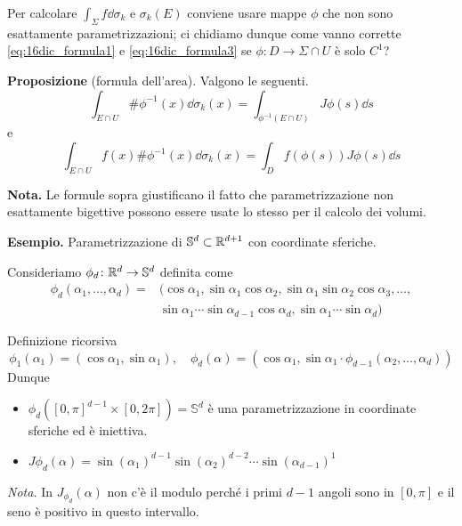 Per calcolare $\int_\Sigma f \dd \sigma_k$ e $\sigma_k(E)$ conviene usare mappe $\phi$ che non sono esattamente parametrizzazioni; ci chidiamo dunque come vanno corrette \eqref{eq:16dic_formula1} e \eqref{eq:16dic_formula3} se $\phi \colon D \to \Sigma \cap U$ è solo $C^1$?

\textbf{Proposizione} (formula dell'area). Valgono le seguenti.
\begin{equation}
	\tag{1'}
	\int_{E \cap U} \# \phi^{-1}(x) \dd \sigma_k(x) = \int_{\phi^{-1}(E \cap U)} J\phi(s) \dd s
\end{equation}
e
\begin{equation}
	\tag{3'}
	\int_{E \cap U} f(x) \# \phi^{-1}(x) \dd \sigma_k (x) = \int_D f(\phi(s)) J\phi(s) \dd s
\end{equation}

\textbf{Nota.} Le formule sopra giustificano il fatto che parametrizzazione non esattamente bigettive possono essere usate lo stesso per il calcolo dei volumi.

\vss

\textbf{Esempio.} Parametrizzazione di $\mathbb{S}^d \subset \mathbb R^{d+1}$ con coordinate sferiche.

Consideriamo $\phi_d \colon \mathbb R^d \to \mathbb{S}^d$ definita come 
%
\begin{align*}
	\phi_d(\alpha_1,\ldots,\alpha_d) = & ( \cos \alpha_1, \sin \alpha_1 \cos \alpha_2, \sin \alpha_1 \sin \alpha_2 \cos \alpha_3,\ldots, \\
	& \sin \alpha_1 \cdots \sin \alpha_{d-1} \cos \alpha_d, \sin \alpha_1 \cdots \sin \alpha_d ) 
\end{align*}

Definizione ricorsiva
%
$$
\phi_1 (\alpha_1) = (\cos \alpha_1, \sin \alpha_1), \quad 
\phi_d(\alpha) = (\cos \alpha_1, \sin \alpha_1 \cdot \phi_{d-1}(\alpha_2,\ldots,\alpha_d))
$$
%
Dunque 
\begin{itemize}

	\item $\phi_d \left( [0,\pi]^{d-1} \times [0,2\pi] \right) = \mathbb{S}^d$ è una parametrizzazione in coordinate sferiche ed è iniettiva.

	\item $J\phi_d(\alpha) = \sin(\alpha_1)^{d-1} \sin(\alpha_2)^{d-2} \cdots \sin(\alpha_{d-1})^1$

\end{itemize}

\textit{Nota.} In $J_{\phi_d}(\alpha)$ non c'è il modulo perché i primi $d-1$ angoli sono in $[0,\pi]$ e il seno è positivo in questo intervallo.

